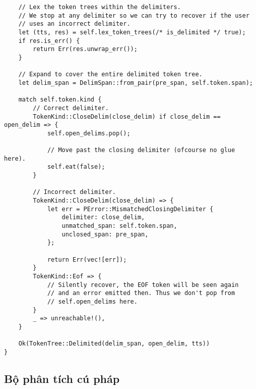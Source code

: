 {\begin{itemize}
\begin{lstlisting}
    // Lex the token trees within the delimiters.
    // We stop at any delimiter so we can try to recover if the user
    // uses an incorrect delimiter.
    let (tts, res) = self.lex_token_trees(/* is_delimited */ true);
    if res.is_err() {
        return Err(res.unwrap_err());
    }

    // Expand to cover the entire delimited token tree.
    let delim_span = DelimSpan::from_pair(pre_span, self.token.span);

    match self.token.kind {
        // Correct delimiter.
        TokenKind::CloseDelim(close_delim) if close_delim == open_delim => {
            self.open_delims.pop();

            // Move past the closing delimiter (ofcourse no glue here).
            self.eat(false);
        }

        // Incorrect delimiter.
        TokenKind::CloseDelim(close_delim) => {
            let err = PError::MismatchedClosingDelimiter {
                delimiter: close_delim,
                unmatched_span: self.token.span,
                unclosed_span: pre_span,
            };

            return Err(vec![err]);
        }
        TokenKind::Eof => {
            // Silently recover, the EOF token will be seen again
            // and an error emitted then. Thus we don't pop from
            // self.open_delims here.
        }
        _ => unreachable!(),
    }

    Ok(TokenTree::Delimited(delim_span, open_delim, tts))
}    
\end{lstlisting}

\end{itemize}

\subsection{Bộ phân tích cú pháp}
}
